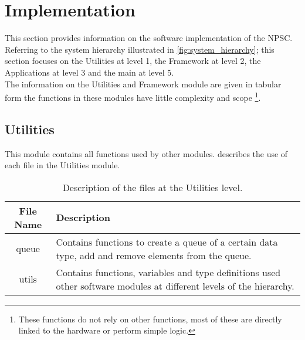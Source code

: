 \chapter{Implementation}
This section provides information on the software implementation of the NPSC. Referring to the system hierarchy illustrated in \cref{fig:system_hierarchy}; this section focuses on the Utilities at level 1, the Framework at level 2, the Applications at level 3 and the main at level 5.\\
The information on the Utilities and Framework module are given in tabular form the functions in these modules have little complexity and scope \footnote{These functions do not rely on other functions, most of these are directly linked to the hardware or perform simple logic.}. 
   
\section{Utilities}
This module contains all functions used by other modules.  describes the use of each file in the Utilities module.
\begin{table}[h!]
\centering
\caption{Description of the files at the Utilities level.}
\label{table:utilities}
\begin{tabular}{cp{30em}}
\hline
\hline
\toprule
\textbf{File Name} & \textbf{Description}\\
\bottomrule
\toprule
queue & Contains functions to create a queue of a certain data type, add and remove elements from the queue. \\
\midrule
utils & Contains functions, variables and type definitions used other software modules at different levels of the hierarchy.\\
\bottomrule
\hline
\hline
\end{tabular}
\end{table}
